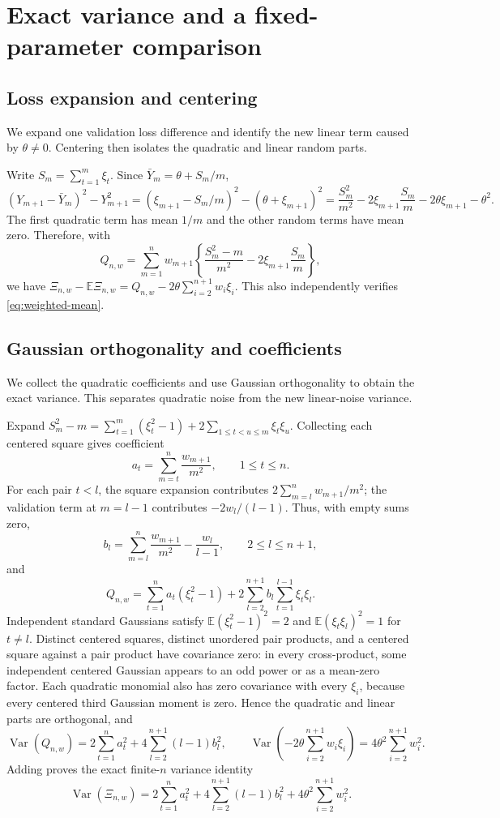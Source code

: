 \documentclass[11pt]{article}
\theoremstyle{definition}
\begin{document}
\section{Exact variance and a fixed-parameter comparison}

\subsection{Loss expansion and centering}\label{app:loss-expansion}
We expand one validation loss difference and identify the new linear term caused by $\theta\ne0$. Centering then isolates the quadratic and linear random parts.

Write $S_m=\sum_{t=1}^m\xi_t$. Since $\bar Y_m=\theta+S_m/m$,
\[
(Y_{m+1}-\bar Y_m)^2-Y_{m+1}^2
=(\xi_{m+1}-S_m/m)^2-(\theta+\xi_{m+1})^2
=\frac{S_m^2}{m^2}-2\xi_{m+1}\frac{S_m}{m}
-2\theta\xi_{m+1}-\theta^2.
\]
The first quadratic term has mean $1/m$ and the other random terms have mean zero. Therefore, with
\[
Q_{n,w}=\sum_{m=1}^nw_{m+1}
\left\{\frac{S_m^2-m}{m^2}-2\xi_{m+1}\frac{S_m}{m}\right\},
\]
we have $\Xi_{n,w}-\mathbb E\Xi_{n,w}=Q_{n,w}-2\theta\sum_{i=2}^{n+1}w_i\xi_i$. This also independently verifies \eqref{eq:weighted-mean}.

\subsection{Gaussian orthogonality and coefficients}\label{app:full-var}
We collect the quadratic coefficients and use Gaussian orthogonality to obtain the exact variance. This separates quadratic noise from the new linear-noise variance.

Expand $S_m^2-m=\sum_{t=1}^m(\xi_t^2-1)+2\sum_{1\le t<u\le m}\xi_t\xi_u$. Collecting each centered square gives coefficient
\[
a_t=\sum_{m=t}^n\frac{w_{m+1}}{m^2},\qquad 1\le t\le n.
\]
For each pair $t<l$, the square expansion contributes $2\sum_{m=l}^nw_{m+1}/m^2$; the validation term at $m=l-1$ contributes $-2w_l/(l-1)$. Thus, with empty sums zero,
\[
b_l=\sum_{m=l}^n\frac{w_{m+1}}{m^2}-\frac{w_l}{l-1},
\qquad 2\le l\le n+1,
\]
and
\[
Q_{n,w}=\sum_{t=1}^na_t(\xi_t^2-1)
+2\sum_{l=2}^{n+1}b_l\sum_{t=1}^{l-1}\xi_t\xi_l.
\]
Independent standard Gaussians satisfy $\mathbb E(\xi_t^2-1)^2=2$ and $\mathbb E(\xi_t\xi_l)^2=1$ for $t\ne l$. Distinct centered squares, distinct unordered pair products, and a centered square against a pair product have covariance zero: in every cross-product, some independent centered Gaussian appears to an odd power or as a mean-zero factor. Each quadratic monomial also has zero covariance with every $\xi_i$, because every centered third Gaussian moment is zero. Hence the quadratic and linear parts are orthogonal, and
\[
\operatorname{Var}(Q_{n,w})=2\sum_{t=1}^na_t^2+
4\sum_{l=2}^{n+1}(l-1)b_l^2,\qquad
\operatorname{Var}\!\left(-2\theta\sum_{i=2}^{n+1}w_i\xi_i\right)
=4\theta^2\sum_{i=2}^{n+1}w_i^2.
\]
Adding proves the exact finite-$n$ variance identity
\begin{equation}\label{eq:variance}
\operatorname{Var}(\Xi_{n,w})
=2\sum_{t=1}^{n}a_t^2+
4\sum_{l=2}^{n+1}(l-1)b_l^2+
4\theta^2\sum_{i=2}^{n+1}w_i^2.
\end{equation}
\end{document}
